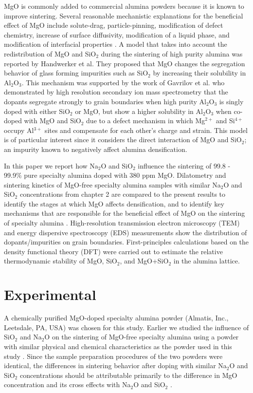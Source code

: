 MgO is commonly added to commercial alumina powders because it is known to improve sintering. Several reasonable mechanistic explanations for the beneficial effect of MgO include solute-drag, particle-pinning, modification of defect chemistry, increase of surface diffusivity, modification of a liquid phase, and modification of interfacial properties \cite{Bae1994}. A model that takes into account the redistribution of MgO and SiO$_{2}$ during the sintering of high purity alumina was reported by Handwerker et al. \cite{Handwerker1989} They proposed that MgO changes the segregation behavior of glass forming impurities such as SiO$_{2}$ by increasing their solubility in Al$_{2}$O$_{3}$. This mechanism was supported by the work of Gavrilov et al. \cite{Gavrilov1999} who demonstrated by high resolution secondary ion mass spectrometry that the dopants segregate strongly to grain boundaries when high purity Al$_{2}$O$_{3}$ is singly doped with either SiO$_{2}$ or MgO, but show a higher solubility in Al$_{2}$O$_{3}$ when co-doped with MgO and SiO$_{2}$ due to a defect mechanism in which Mg$^{2+}$ and Si$^{4+}$ occupy Al$^{3+}$ sites and compensate for each other's charge and strain. This model is of particular interest since it considers the direct interaction of MgO and SiO$_{2}$; an impurity known to negatively affect alumina densification. 

In this paper we report how Na$_{2}$O and SiO$_{2}$ influence the sintering of 99.8 - 99.9\% pure specialty alumina doped with 380 ppm MgO. Dilatometry and sintering kinetics of MgO-free specialty alumina samples with similar Na$_{2}$O and SiO$_{2}$ concentrations from chapter 2 are compared to the present results to identify the stages at which MgO affects densification, and to identify key mechanisms that are responsible for the beneficial effect of MgO on the sintering of specialty alumina \cite{Frueh2016}. High-resolution transmission electron microscopy (TEM) and energy dispersive spectroscopy (EDS) measurements show the distribution of dopants/impurities on grain boundaries. First-principles calculations based on the density functional theory (DFT) were carried out to estimate the relative thermodynamic stability of MgO, SiO$_{2}$, and MgO+SiO$_{2}$ in the alumina lattice.


\section{Experimental}

A chemically purified MgO-doped specialty alumina powder (Almatis, Inc., Leetsdale, PA, USA) was chosen for this study. Earlier we studied the influence of SiO$_{2}$ and Na$_{2}$O on the sintering of MgO-free specialty alumina using a powder with similar physical and chemical characteristics as the powder used in this study \cite{Frueh2016}. Since the sample preparation procedures of the two powders were identical, the differences in sintering behavior after doping with similar Na$_{2}$O and SiO$_{2}$ concentrations should be attributable primarily to the difference in MgO concentration and its cross effects with Na$_{2}$O and SiO$_{2}$ \cite{Frueh2016}. 

